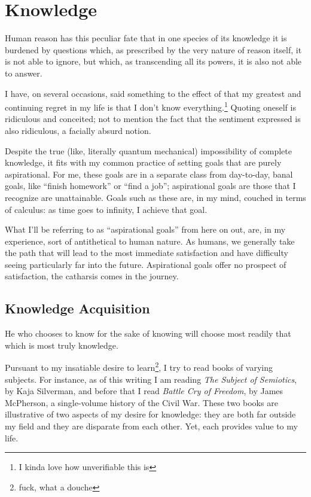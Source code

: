 \documentclass[../philo.tex]{subfiles}
\begin{document}
\chapter{Knowledge}
\epigraph{Human reason has this peculiar fate that in one species of its knowledge it is burdened by questions which, as prescribed by the very nature of reason itself, it is not able to ignore, but which, as transcending all its powers, it is also not able to answer.}{}
\newpage

I have, on several occasions, said something to the effect of that my greatest and continuing regret in my life is that I don't know everything.\footnote{I kinda love how unverifiable this is}
Quoting oneself is ridiculous and conceited; not to mention the fact that the sentiment expressed is also ridiculous, a facially absurd notion.

Despite the true (like, literally quantum mechanical) impossibility of complete knowledge, it fits with my common practice of setting goals that are purely aspirational.
For me, these goals are in a separate class from day-to-day, banal goals, like ``finish homework'' or ``find a job''; aspirational goals are those that I recognize are unattainable.
Goals such as these are, in my mind, couched in terms of calculus: as time goes to infinity, I achieve that goal.

What I'll be referring to as ``aspirational goals'' from here on out, are, in my experience, sort of antithetical to human nature.
As humans, we generally take the path that will lead to the most immediate satisfaction and have difficulty seeing particularly far into the future.
Aspirational goals offer no prospect of satisfaction, the catharsis comes in the journey.

\section{Knowledge Acquisition}
\epigraph{He who chooses to know for the sake of knowing will choose most readily that which is most truly knowledge.}{}

Pursuant to my insatiable desire to learn\footnote{fuck, what a douche}, I try to read books of varying subjects.
For instance, as of this writing I am reading \textit{The Subject of Semiotics}, by Kaja Silverman, and before that I read \textit{Battle Cry of Freedom}, by James McPherson, a single-volume history of the Civil War.
These two books are illustrative of two aspects of my desire for knowledge: they are both far outside my field and they are disparate from each other.
Yet, each provides value to my life.
\end{document}
